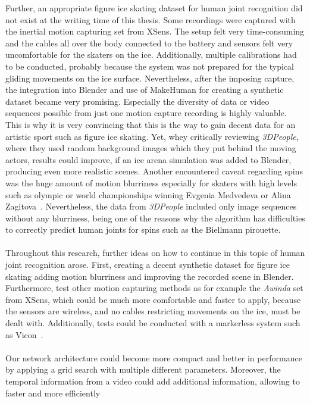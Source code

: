 Further, an appropriate figure ice skating dataset for human joint recognition did not exist at the writing time of this thesis.
Some recordings were captured with the inertial motion capturing set from XSens.
The setup felt very time-consuming and the cables all over the body connected to the battery and sensors felt very uncomfortable
for the skaters on the ice.
Additionally, multiple calibrations had to be conducted, probably because the system was not prepared
for the typical gliding movements on the ice surface.
Nevertheless, after the imposing capture, the integration into Blender and use of MakeHuman for creating a synthetic dataset
became very promising.
Especially the diversity of data or video sequences possible from just one motion capture recording is highly valuable.
This is why it is very convincing that this is the way to gain decent data for an artistic sport such as figure
ice skating.
Yet, whey critically reviewing \textit{3DPeople}, where they used random background images which they put behind the moving actors,
results could improve, if an ice arena simulation was added to Blender, producing even more realistic scenes.
Another encountered caveat regarding spins was the huge amount of motion blurriness especially for skaters with high levels such as olympic or world championships winning
Evgenia Medvedeva or Alina Zagitova~\cite{2018world}.
Nevertheless, the data from \textit{3DPeople} included only image sequences without any blurriness, being one of the reasons why
the algorithm has difficulties to correctly predict human joints for spins such as the Biellmann pirouette.
\\\mbox{}\\
Throughout this research, further ideas on how to continue in this topic of human joint recognition arose.
First, creating a decent synthetic dataset for figure ice skating adding motion blurriness and improving the recorded scene
in Blender.\\
Furthermore, test other motion capturing methods as for example the \textit{Awinda} set from XSens, which could be much more comfortable
and faster to apply, because the sensors are wireless, and no cables restricting movements on the ice, must be dealt with.
Additionally, tests could be conducted with a markerless system such as Vicon~\cite{mocapoptical}.
\\\mbox{}\\%
Our network architecture could become more compact and better in performance by applying a grid search with multiple different
parameters.
Moreover, the temporal information from a video could add additional information, allowing to faster and more efficiently
